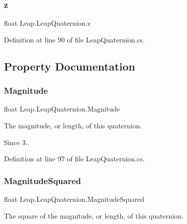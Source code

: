 \subsubsection{\texorpdfstring{z}{z}}
{\footnotesize\ttfamily float Leap.\+Leap\+Quaternion.\+z}



Definition at line 90 of file Leap\+Quaternion.\+cs.



\subsection{Property Documentation}
\mbox{\label{struct_leap_1_1_leap_quaternion_acd8798fff0933b8daceb61162257c0e1}} 
\subsubsection{\texorpdfstring{Magnitude}{Magnitude}}
{\footnotesize\ttfamily float Leap.\+Leap\+Quaternion.\+Magnitude\hspace{0.3cm}{\ttfamily [get]}}



The magnitude, or length, of this quaternion. 

\begin{DoxySince}{Since}
3.. 
\end{DoxySince}


Definition at line 97 of file Leap\+Quaternion.\+cs.

\mbox{\label{struct_leap_1_1_leap_quaternion_a1bae32bdd879d243ef609e86a980e49a}} 
\subsubsection{\texorpdfstring{MagnitudeSquared}{MagnitudeSquared}}
{\footnotesize\ttfamily float Leap.\+Leap\+Quaternion.\+Magnitude\+Squared\hspace{0.3cm}{\ttfamily [get]}}



The square of the magnitude, or length, of this quaternion. 

